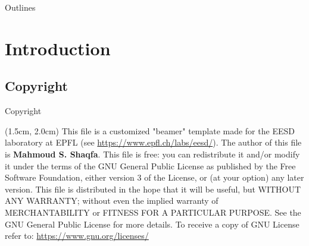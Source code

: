 \documentclass[editmode]{EPFL_BEAMER}
\begin{document}

\begin{frame}{Outlines}
\begin{multicols}{2}
\tableofcontents
\end{multicols}
\end{frame}

\section{Introduction}

\breakingframe{
}

\blackbreakingframe{
}


\cyanbreakingframe{
}

\subsection{Copyright}
\begin{frame}[t]{Copyright}
\begin{textblock*}{13cm}(1.5cm,  2.0cm)
    {\selectfont
    This file is a customized "beamer" template made for the EESD laboratory at EPFL (see \href{https://www.epfl.ch/labs/eesd/}{https://www.epfl.ch/labs/eesd/}). The author of this file is \textbf{Mahmoud S. Shaqfa}. This file is free: you can redistribute it and/or modify it under the terms of the GNU General Public License as published by    the Free Software Foundation, either version 3 of the License, or (at your option) any later version. This file is distributed in the hope that it will be useful, but WITHOUT ANY WARRANTY; without even the implied warranty of MERCHANTABILITY or FITNESS FOR A PARTICULAR PURPOSE.  See the GNU General Public License for more details. To receive a copy of GNU License refer to: \href{https://www.gnu.org/licenses/}{https://www.gnu.org/licenses/}
    }
\end{textblock*}
\end{frame}
\end{document}
